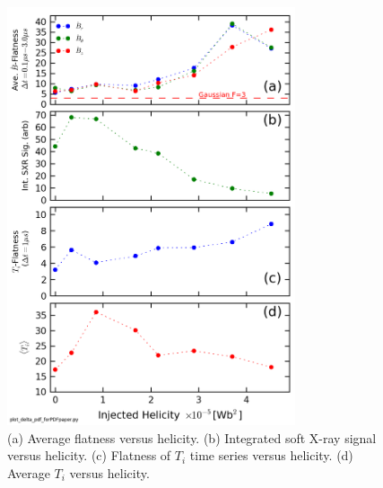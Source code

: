 \documentclass[aip,prl,amsmath,amssymb,reprint,superscriptaddress]{revtex4-1} %
\begin{document}
\begin{figure}[!htbp]
\centerline{
\includegraphics[width=8.5cm]{flatness_scaling.png}}
\caption{\label{fig:flatness_scaling} (a) Average flatness versus helicity. (b) Integrated soft X-ray signal versus helicity. (c) Flatness of $T_{i}$ time series versus helicity. (d) Average $T_{i}$ versus helicity.}
\end{figure}
\end{document}

